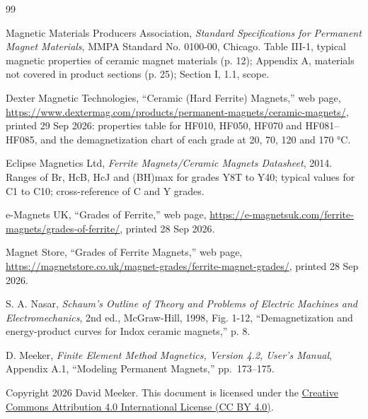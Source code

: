 \documentclass[
  11pt,
]{article}
\begin{document}
\begin{thebibliography}{99}\label{references}

 Magnetic Materials Producers Association, \emph{Standard Specifications for Permanent Magnet Materials}, MMPA Standard No. 0100-00, Chicago. Table III-1, typical magnetic properties of ceramic magnet materials (p. 12); Appendix A, materials not covered in product sections (p. 25); Section I, 1.1, scope.

 Dexter Magnetic Technologies, ``Ceramic (Hard Ferrite) Magnets,'' web page, \url{https://www.dextermag.com/products/permanent-magnets/ceramic-magnets/}, printed 29 Sep 2026: properties table for HF010, HF050, HF070 and HF081--HF085, and the demagnetization chart of each grade at 20, 70, 120 and 170 °C.

 Eclipse Magnetics Ltd, \emph{Ferrite Magnets/Ceramic Magnets Datasheet}, 2014. Ranges of Br, HcB, HcJ and (BH)max for grades Y8T to Y40; typical values for C1 to C10; cross-reference of C and Y grades.

 e-Magnets UK, ``Grades of Ferrite,'' web page, \url{https://e-magnetsuk.com/ferrite-magnets/grades-of-ferrite/}, printed 28 Sep 2026.

 Magnet Store, ``Grades of Ferrite Magnets,'' web page, \url{https://magnetstore.co.uk/magnet-grades/ferrite-magnet-grades/}, printed 28 Sep 2026.

 S. A. Nasar, \emph{Schaum's Outline of Theory and Problems of Electric Machines and Electromechanics}, 2nd ed., McGraw-Hill, 1998, Fig. 1-12, ``Demagnetization and energy-product curves for Indox ceramic magnets,'' p. 8.

 D. Meeker, \emph{Finite Element Method Magnetics, Version 4.2, User's Manual}, Appendix A.1, ``Modeling Permanent Magnets,'' pp.~173--175.

\end{thebibliography}

\noindent Copyright 2026 David Meeker. This document is licensed under the \href{https://creativecommons.org/licenses/by/4.0/}{Creative Commons Attribution 4.0 International License (CC BY 4.0)}.
\end{document}
